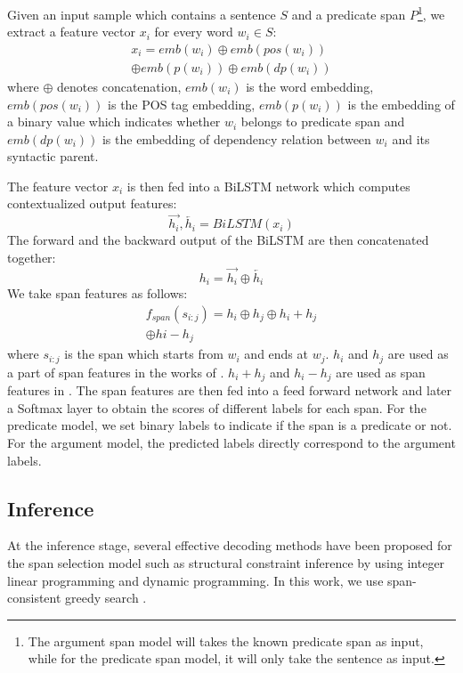 \documentclass[letterpaper]{article} %
\begin{document}
Given an input sample which contains a sentence $S$ and a predicate span $P$\footnote{The argument span model will takes the known predicate span as input, while for the predicate span model, it will only take the sentence as input.}, we extract a feature vector $x_i$ for every word $w_i \in S $:
\begin{equation}
    \begin{split}
        x_i=emb(w_i) \oplus emb(pos(w_i))
        \\ \oplus  emb(p(w_i)) \oplus emb(dp(w_i))
    \end{split}
\end{equation}
where $\oplus$ denotes concatenation, $emb(w_i)$ is the word embedding, $emb(pos(w_i))$ is the POS tag embedding, $emb(p(w_i))$ is the embedding of a binary value which indicates whether $w_i$ belongs to predicate span and $emb(dp(w_i))$ is the embedding of dependency relation between $w_i$ and its syntactic parent.

The feature vector $x_i$ is then fed into a BiLSTM network which computes contextualized output features:
\begin{equation}
    \overrightarrow{h_i},\overleftarrow{h_i} = BiLSTM(x_i)
\end{equation}
The forward and the backward output of the BiLSTM are then concatenated together:
\begin{equation}
    h_i = \overrightarrow{h_i}\oplus\overleftarrow{h_i}
\end{equation}
We take span features as follows:
\begin{equation}\label{span_feature}
    \begin{split}
        f_{span}(s_{i:j}) = h_i \oplus h_j \oplus h_i + h_j\\
         \oplus hi - h_j
    \end{split}
\end{equation}
where $s_{i:j}$ is the span which starts from $w_i$ and ends at $w_j$. $h_i$ and $h_j$ are used as a part of span features in the works of \cite{He2018JointlyPP}. $h_i+h_j$ and $h_i-h_j$ are used as span features in \cite{Ouchi2018ASS}. The span features are then fed into a feed forward network and later a Softmax layer to obtain the scores of different labels for each span. For the predicate model, we set binary labels to indicate if the span is a predicate or not. For the argument model, the predicted labels directly correspond to the argument labels.

\subsection{Inference}
 At the inference stage, several effective decoding methods have been proposed for the span selection model such as structural constraint inference by using integer linear programming  and dynamic programming. In this work, we use  span-consistent greedy search \cite{Ouchi2018ASS}.
\end{document}
